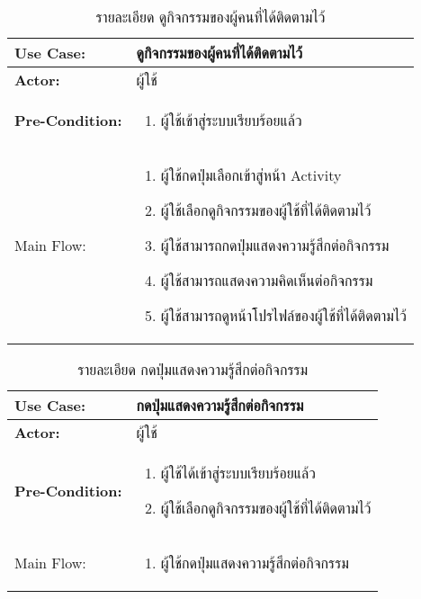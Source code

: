 \begin{table}
    \caption{รายละเอียด ดูกิจกรรมของผู้คนที่ได้ติดตามไว้}
    \begin{tabularx}{\textwidth}{ | >{\centering\bf} p{3cm} | X |}
        \hline
        Use Case: & ดูกิจกรรมของผู้คนที่ได้ติดตามไว้ \\\hline
        Actor: & ผู้ใช้ \\\hline
        Pre-Condition: &
        \begin{enumerate}[table]
            \item ผู้ใช้เข้าสู่ระบบเรียบร้อยแล้ว         
        \end{enumerate} \\\hline
        
        Main Flow: & 
        \begin{enumerate}[table]
            \item ผู้ใช้กดปุ่มเลือกเข้าสู่หน้า Activity
            \item ผู้ใช้เลือกดูกิจกรรมของผู้ใช้ที่ได้ติดตามไว้
            \item ผู้ใช้สามารถกดปุ่มแสดงความรู้สึกต่อกิจกรรม
            \item ผู้ใช้สามารถแสดงความคิดเห็นต่อกิจกรรม
            \item ผู้ใช้สามารถดูหน้าโปรไฟล์ของผู้ใช้ที่ได้ติดตามไว้
        \end{enumerate}\\\hline
    \end{tabularx}
\end{table}


\begin{table}
    \caption{รายละเอียด กดปุ่มแสดงความรู้สึกต่อกิจกรรม}
    \begin{tabularx}{\textwidth}{ | >{\centering\bf} p{3cm} | X |}
        \hline
        Use Case: & กดปุ่มแสดงความรู้สึกต่อกิจกรรม \\\hline
        Actor: & ผู้ใช้ \\\hline
        Pre-Condition: &
        \begin{enumerate}[table]
            \item ผู้ใช้ได้เข้าสู่ระบบเรียบร้อยแล้ว
            \item ผู้ใช้เลือกดูกิจกรรมของผู้ใช้ที่ได้ติดตามไว้
                   
        \end{enumerate} \\\hline
        
        Main Flow: & 
        \begin{enumerate}[table]
            \item ผู้ใช้กดปุ่มแสดงความรู้สึกต่อกิจกรรม
        \end{enumerate}\\\hline
    \end{tabularx}
\end{table}



